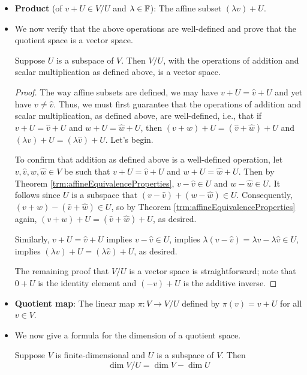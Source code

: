 \documentclass[../main.tex]{subfiles}
\begin{document}
\begin{itemize}
    \item \textbf{Product} (of $v+U\in V/U$ and $\lambda\in\mathbb{F}$): The affine subset $(\lambda v)+U$.
    \item We now verify that the above operations are well-defined and prove that the quotient space is a vector space.
    \begin{theorem}
        Suppose $U$ is a subspace of $V$. Then $V/U$, with the operations of addition and scalar multiplication as defined above, is a vector space.
        \begin{proof}
            The way affine subsets are defined, we may have $v+U=\hat{v}+U$ and yet have $v\neq\hat{v}$. Thus, we must first guarantee that the operations of addition and scalar multiplication, as defined above, are well-defined, i.e., that if $v+U=\hat{v}+U$ and $w+U=\hat{w}+U$, then $(v+w)+U=(\hat{v}+\hat{w})+U$ and $(\lambda v)+U=(\lambda\hat{v})+U$. Let's begin.\par
            To confirm that addition as defined above is a well-defined operation, let $v,\hat{v},w,\hat{w}\in V$ be such that $v+U=\hat{v}+U$ and $w+U=\hat{w}+U$. Then by Theorem \ref{trm:affineEquivalenceProperties}, $v-\hat{v}\in U$ and $w-\hat{w}\in U$. It follows since $U$ is a subspace that $(v-\hat{v})+(w-\hat{w})\in U$. Consequently, $(v+w)-(\hat{v}+\hat{w})\in U$, so by Theorem \ref{trm:affineEquivalenceProperties} again, $(v+w)+U=(\hat{v}+\hat{w})+U$, as desired.\par
            Similarly, $v+U=\hat{v}+U$ implies $v-\hat{v}\in U$, implies $\lambda(v-\hat{v})=\lambda v-\lambda\hat{v}\in U$, implies $(\lambda v)+U=(\lambda\hat{v})+U$, as desired.\par\smallskip
            The remaining proof that $V/U$ is a vector space is straightforward; note that $0+U$ is the identity element and $(-v)+U$ is the additive inverse.
        \end{proof}
    \end{theorem}
    \item \textbf{Quotient map}: The linear map $\pi:V\to V/U$ defined by $\pi(v)=v+U$ for all $v\in V$.
    \item We now give a formula for the dimension of a quotient space.
    \begin{theorem}\label{trm:dimQuotientSpace}
        Suppose $V$ is finite-dimensional and $U$ is a subspace of $V$. Then
        \begin{equation*}
            \dim V/U = \dim V-\dim U
        \end{equation*}

\end{theorem}
\end{itemize}
\end{document}
